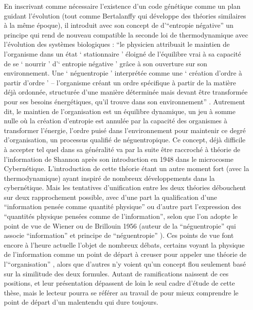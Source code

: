 En inscrivant comme nécessaire l'existence d'un code génétique comme un plan guidant l'évolution (tout comme Bertalanffy qui développe des théories similaires à la même époque), il introduit avec son concept de d'\enquote{entropie négative} un principe qui rend de nouveau compatible la seconde loi de thermodynamique avec l'évolution des systèmes biologiques : \enquote{le physicien attribuait le maintien de l’organisme dans un état \enquote{ stationnaire } éloigné de l’équilibre vrai à sa capacité de se \enquote{ nourrir } d’\enquote{ entropie négative } grâce à son ouverture sur son environnement. Une \enquote{ néguentropie } interprétée comme une \enquote{ création d’ordre à partir d’ordre } -- l’organisme créant un ordre spécifique à partir de la matière déjà ordonnée, structurée d’une manière déterminée mais devant être transformée pour ses besoins énergétiques, qu’il trouve dans son environnement} \autocite[502]{Pouvreau2013}. Autrement dit, le maintien de l'organisation est un équilibre dynamique, un jeu à somme nulle où la création d'entropie est annulée par la capacité des organismes à transformer l'énergie, l'ordre puisé dans l'environnement pour maintenir ce degré d'organisation, un processus qualifié de néguentropique. Ce concept, déjà difficile à accepter tel quel dans sa généralité \autocite[225]{Lemoigne1977} va par la suite être raccroché à théorie de l'information de Shannon après son introduction en 1948 dans le microcosme Cybernétique. L'introduction de cette théorie étant un autre moment fort (avec la thermodynamique) ayant inspiré de nombreux développements dans la cybernétique. Mais les tentatives d'unification entre les deux théories débouchent sur deux rapprochement possible, avec d'une part la qualification d'une \enquote{information pensée comme quantité physique} ou d'autre part l'expression des \enquote{quantités physique pensées comme de l'information}, selon que l'on adopte le point de vue de Wiener ou de Brillouin 1956 \autocite{Brillouin1956} (auteur de la \enquote{néguentropie} qui associe \enquote{information} et principe de \enquote{néguentropie} ). Ces points de vue font encore à l'heure actuelle l'objet de nombreux débats, certains voyant la physique de l'information comme un point de départ à creuser pour appeler une théorie de l'\enquote{organisation} \autocite[37-38]{Morin1990}, alors que d'autres n'y voient qu'un concept flou seulement basé sur la similitude des deux formules. Autant de ramifications naissent de ces positions, et leur présentation dépassent de loin le seul cadre d'étude de cette thèse, mais le lecteur pourra se référer au travail de \autocite{Triclot2007} pour mieux comprendre le point de départ d'un malentendu qui dure toujours. 

